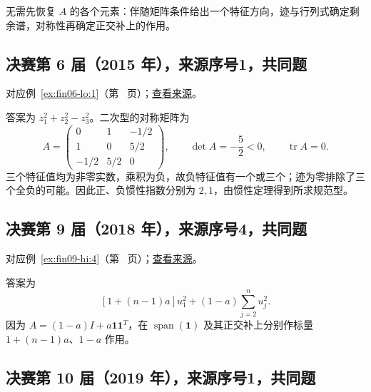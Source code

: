 \documentclass[UTF8,12pt,a4paper,fontset=fandol]{ctexart}
\begin{document}
\begin{remark}[方法与条件]

无需先恢复 $A$ 的各个元素：伴随矩阵条件给出一个特征方向，迹与行列式确定剩余谱，对称性再确定正交补上的作用。

\end{remark}

\subsection{决赛第 6 届（2015 年），来源序号1，共同题}\label{ans:fin06-lo:1}\label{pr:fin06-lo:1}

对应例~\ref{ex:fin06-lo:1}（第~\pageref{ex:fin06-lo:1} 页）；\href{https://github.com/lzxcr/cmc-mathematics/blob/64916fa1fdbc3e444a652eca204d5669058ee321/src/problems/finals/06/01.md}{查看来源}。

\begin{solve}

答案为 $z_1^2+z_2^2-z_3^2$。二次型的对称矩阵为
\[
A=\begin{pmatrix}0&1&-1/2\\1&0&5/2\\-1/2&5/2&0\end{pmatrix},
\qquad \det A=-\frac52<0,\qquad\operatorname{tr}A=0.
\]
三个特征值均为非零实数，乘积为负，故负特征值有一个或三个；迹为零排除了三个全负的可能。因此正、负惯性指数分别为 $2,1$，由惯性定理得到所求规范型。

\end{solve}

\subsection{决赛第 9 届（2018 年），来源序号4，共同题}\label{ans:fin09-hi:4}\label{pr:fin09-hi:4}

对应例~\ref{ex:fin09-hi:4}（第~\pageref{ex:fin09-hi:4} 页）；\href{https://github.com/lzxcr/cmc-mathematics/blob/64916fa1fdbc3e444a652eca204d5669058ee321/src/problems/finals/09/04.md}{查看来源}。

\begin{solve}

答案为
\[
[1+(n-1)a]u_1^2+(1-a)\sum_{j=2}^nu_j^2.
\]
因为 $A=(1-a)I+a\mathbf1\mathbf1^T$，在 $\operatorname{span}(\mathbf1)$ 及其正交补上分别作标量 $1+(n-1)a$、$1-a$ 作用。

\end{solve}

\subsection{决赛第 10 届（2019 年），来源序号1，共同题}\label{ans:fin10-hi:1}\label{pr:fin10-hi:1}
\end{document}
